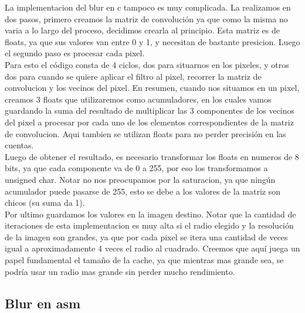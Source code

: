 La implementacion del blur en c tampoco es muy complicada. La realizamos en dos pasos, primero creamos la matriz de convolución ya que como la misma no varia a lo largo del proceso, decidimos crearla al principio. Esta matriz es de floats, ya que sus valores van entre 0 y 1, y necesitan de bastante presicion.  Luego el segundo paso es procesar cada pixel. \\
Para esto el código consta de 4 ciclos, dos para situarnos en los pixeles, y otros dos para cuando se quiere aplicar el filtro al pixel, recorrer la matriz de convolucion y los vecinos del pixel. En resumen, cuando nos situamos en un pixel, creamos 3 floats que utilizaremos como acumuladores, en los cuales vamos guardando la suma del resultado de multiplicar las 3 componentes de los vecinos del pixel a procesar por cada uno de los elementos correspondientes de la matriz de convolucion. Aqui tambien se utilizan floats para no perder precisión en las cuentas.\\
Luego de obtener el resultado, es necesario transformar los floats en numeros de 8 bits, ya que cada componente va de 0 a 255, por eso los transformamos a unsigned char. Notar no nos preocupamos por la saturacion, ya que ningún acumulador puede pasarse de 255, esto se debe a los valores de la matriz son chicos (su suma da 1). \\
Por ultimo guardamos los valores en la imagen destino. Notar que la cantidad de iteraciones de esta implementacion es muy alta si el radio elegido y la resolución de la imagen son grandes, ya que por cada pixel se itera una cantidad de veces igual a aproximadamente 4 veces el radio al cuadrado. Creemos que aquí juega un papel fundamental el tamaño de la cache, ya que mientras mas grande sea, se podría usar un radio mas grande sin perder mucho rendimiento. \\

\subsection{Blur en asm}

